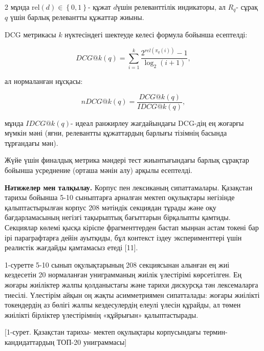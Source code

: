 \begin{multicols}{2}
мұнда \(\text{rel}(d) \in \left\{ 0,1 \right\}\)- құжат \(d\)үшін
релеванттілік индикаторы, ал \(R_{q}\)- сұрақ \(q\) үшін барлық
релевантты құжаттар жиыны.

DCG метрикасы \(k\) нүктесіндегі шектеуде келесі формула бойынша
есептелді:

\[DCG@k(q) = \sum_{i = 1}^{k}\frac{2^{rel(\pi_{q}(i))} - 1}{{\log}_{2}(i + 1)},\]

ал нормаланған нұсқасы:

\[nDCG@k(q) = \frac{DCG@k(q)}{IDCG@k(q)},\]

мұнда \(IDCG@k(q)\)- идеал ранжирлеу жағдайындағы DCG-дің ең жоғарғы
мүмкін мәні (яғни, релевантты құжаттардың барлығы тізімнің басында
тұрғандағы мән).

Жүйе үшін финалдық метрика мәндері тест жиынтығындағы барлық сұрақтар
бойынша усреднение (орташа мәнін алу) арқылы есептелді.

{\bfseries Нәтижелер мен талқылау.} Корпус пен лексиканың сипаттамалары.
Қазақстан тарихы бойынша 5-10 сыныптарға арналған мектеп оқулықтары
негізінде қалыптастырылған корпус 208 мәтіндік секциядан тұрады және оқу
бағдарламасының негізгі тақырыптық бағыттарын бірқалыпты қамтиды.
Секциялар көлемі қысқа кіріспе фрагменттерден бастап мыңнан астам токені
бар ірі параграфтарға дейін ауытқиды, бұл контекст іздеу эксперименттері
үшін реалистік жағдайды қамтамасыз етеді {[}11{]}.

1-суретте 5-10 сынып оқулықтарының 208 секциясынан алынған ең жиі
кездесетін 20 нормаланған униграмманың жиілік үлестірімі көрсетілген. Ең
жоғары жиіліктер жалпы қолданыстағы және тарихи дискурсқа тән
лексемаларға тиесілі. Үлестірім айқын оң жақты асимметриямен
сипатталады: жоғары жиілікті токендердің аз бөлігі жалпы кездесулердің
елеулі үлесін құрайды, ал төмен жиілікті бірліктер үлестірімнің
«құйрығын» қалыптастырады.
\end{multicols}

[1-сурет. Қазақстан тарихы- мектеп оқулықтары корпусындағы
термин-кандидаттардың ТОП-20 униграммасы]

